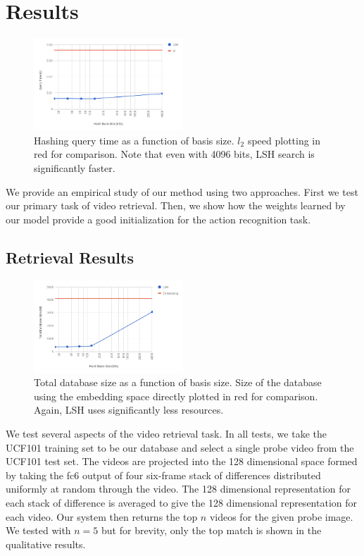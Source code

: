 \section{Results}\label{sec:results}

\begin{figure}[t]
    \centering
    \includegraphics[width=0.5\textwidth]{images/hashing_time_results.png}
    \caption{Hashing query time as a function of basis size. $l_2$ speed plotting in red for comparison. Note that even with 4096 bits, LSH search is significantly faster.}
    \label{fig:speedres}
\end{figure}

We provide an empirical study of our method using two approaches. First we test our primary task of video retrieval. Then, we show how the weights learned by our model provide a good initialization for the action recognition task.

\subsection{Retrieval Results}

\begin{figure}[t]
    \centering
    \includegraphics[width=0.5\textwidth]{images/hashing_memory_results.png}
    \caption{Total database size as a function of basis size. Size of the database using the embedding space directly plotted in red for comparison. Again, LSH uses significantly less resources.}
    \label{fig:memres}
\end{figure}

We test several aspects of the video retrieval task. In all tests, we take the UCF101 training set to be our database and select a single probe video from the UCF101 test set. The videos are projected into the 128 dimensional space formed by taking the fc6 output of four six-frame stack of differences distributed uniformly at random through the video. The 128 dimensional representation for each stack of difference is averaged to give the 128 dimensional representation for each video. Our system then returns the top $n$ videos for the given probe image. We tested with $n=5$ but for brevity, only the top match is shown in the qualitative results.

